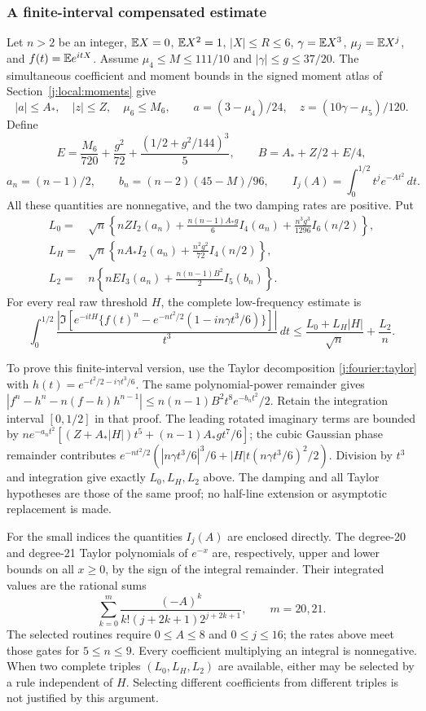\subsubsection{A finite-interval compensated estimate}
Let $n>2$ be an integer, $\mathbb E X=0$, $\mathbb E X^2=1$, $|X|\le R\le6$,
$\gamma=\mathbb E X^3$, $\mu_j=\mathbb E X^j$, and $f(t)=\mathbb E e^{itX}$.
Assume $\mu_4\le M\le111/10$ and $|\gamma|\le g\le37/20$.
The simultaneous coefficient and moment bounds in the signed moment atlas
of Section~\ref{j:local:moments} give
\[
 |a|\le A_*,\quad |z|\le Z,\quad \mu_6\le M_6,
 \qquad a=(3-\mu_4)/24,\quad z=(10\gamma-\mu_5)/120.
\]
Define
\[
 E=\frac{M_6}{720}+\frac{g^2}{72}
       +\frac{(1/2+g^2/144)^3}{5},\qquad
 B=A_*+Z/2+E/4,
\]
\[
 a_n=(n-1)/2,\qquad b_n=(n-2)(45-M)/96,\qquad
 I_j(A)=\int_0^{1/2}t^j e^{-At^2}\,dt.
\]
All these quantities are nonnegative, and the two damping rates are
positive. Put
\begin{align*}
 L_0={}&\sqrt n\left\{nZI_2(a_n)
       +\frac{n(n-1)A_*g}{6}I_4(a_n)
       +\frac{n^3g^3}{1296}I_6(n/2)\right\},\\
 L_H={}&\sqrt n\left\{nA_*I_2(a_n)
                              +\frac{n^2g^2}{72}I_4(n/2)\right\},\\
 L_2={}&n\left\{nEI_3(a_n)+\frac{n(n-1)B^2}{2}I_5(b_n)\right\}.
\end{align*}
For every real raw threshold $H$, the complete low-frequency estimate is
\begin{equation}\label{j:finite:finite-low}
 \int_0^{1/2}\frac{\left|\Im\left[e^{-itH}
 \{f(t)^n-e^{-nt^2/2}(1-in\gamma t^3/6)\}\right]\right|}{t^3}\,dt
 \le\frac{L_0+L_H|H|}{\sqrt n}+\frac{L_2}{n}.
\end{equation}

To prove this finite-interval version, use the Taylor decomposition
\eqref{j:fourier:taylor} with $h(t)=e^{-t^2/2-i\gamma t^3/6}$.
The same polynomial-power remainder gives
$|f^n-h^n-n(f-h)h^{n-1}|
\le n(n-1)B^2t^8e^{-b_nt^2}/2$.
Retain the integration interval $[0,1/2]$ in that proof.
The leading rotated imaginary terms are bounded by
$ne^{-a_nt^2}[(Z+A_*|H|)t^5+(n-1)A_*gt^7/6]$;
the cubic Gaussian phase remainder contributes
$e^{-nt^2/2}(|n\gamma t^3/6|^3/6+
|H|t(n\gamma t^3/6)^2/2)$.
Division by $t^3$ and integration give exactly $L_0,L_H,L_2$ above.
The damping and all Taylor hypotheses are those of the same proof;
no half-line extension or asymptotic replacement is made.

For the small indices the quantities $I_j(A)$ are enclosed directly.
The degree-20 and degree-21 Taylor polynomials of $e^{-x}$ are,
respectively, upper and lower bounds on all $x\ge0$, by the sign of
the integral remainder. Their integrated values are the rational sums
\[
 \sum_{k=0}^{m}\frac{(-A)^k}{k!(j+2k+1)2^{j+2k+1}},
 \qquad m=20,21.
\]
The selected routines require $0\le A\le8$ and $0\le j\le16$;
the rates above meet those gates for $5\le n\le9$.
Every coefficient multiplying an integral is nonnegative. When two
complete triples $(L_0,L_H,L_2)$ are available, either may be selected
by a rule independent of $H$. Selecting different coefficients from
different triples is not justified by this argument.

